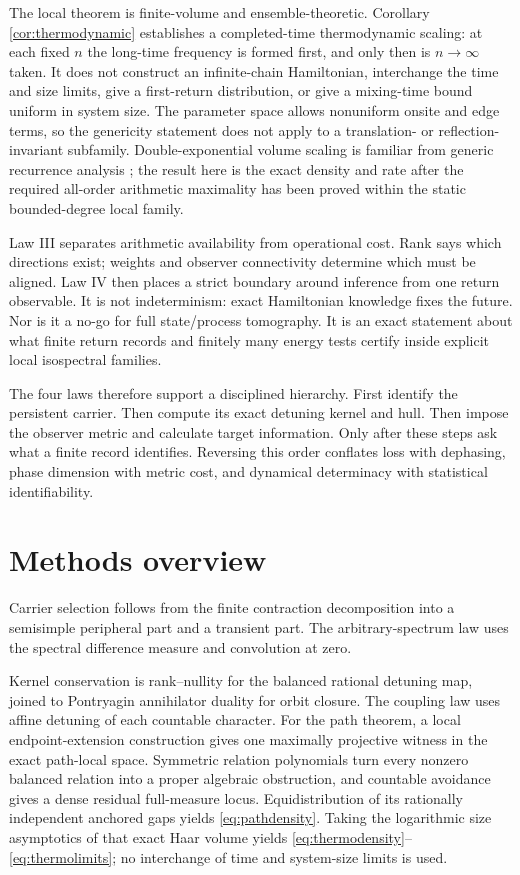 \documentclass[10pt]{article}
\theoremstyle{definition}
\begin{document}
The local theorem is finite-volume and ensemble-theoretic.  Corollary
\ref{cor:thermodynamic} establishes a completed-time thermodynamic scaling:
at each fixed $n$ the long-time frequency is formed first, and only then is
$n\to\infty$ taken.  It does not construct an infinite-chain Hamiltonian,
interchange the time and size limits, give a first-return distribution, or
give a mixing-time bound uniform in system size.  The parameter space allows
nonuniform onsite and edge terms, so the genericity statement does not apply
to a translation- or reflection-invariant subfamily.  Double-exponential
volume scaling is familiar from generic recurrence analysis
\cite{CamposVenuti2015}; the result here is the exact density and rate after
the required all-order arithmetic maximality has been proved within the
static bounded-degree local family.

Law III separates arithmetic availability from operational cost.  Rank says
which directions exist; weights and observer connectivity determine which
must be aligned.  Law IV then places a strict boundary around inference from
one return observable.  It is not indeterminism: exact Hamiltonian knowledge
fixes the future.  Nor is it a no-go for full state/process tomography.  It
is an exact statement about what finite return records and finitely many
energy tests certify inside explicit local isospectral families.

The four laws therefore support a disciplined hierarchy.  First identify
the persistent carrier.  Then compute its exact detuning kernel and hull.
Then impose the observer metric and calculate target information.  Only
after these steps ask what a finite record identifies.  Reversing this order
conflates loss with dephasing, phase dimension with metric cost, and dynamical
determinacy with statistical identifiability.

\section{Methods overview}

Carrier selection follows from the finite contraction decomposition into a
semisimple peripheral part and a transient part.  The arbitrary-spectrum
law uses the spectral difference measure and convolution at zero.

Kernel conservation is rank--nullity for the balanced rational detuning map,
joined to Pontryagin annihilator duality for orbit closure.  The coupling law
uses affine detuning of each countable character.  For the path theorem, a
local endpoint-extension construction gives one maximally projective witness
in the exact path-local space.  Symmetric relation polynomials turn every
nonzero balanced relation into a proper algebraic obstruction, and countable
avoidance gives a dense residual full-measure locus.  Equidistribution of its
rationally independent anchored gaps yields \eqref{eq:pathdensity}.
Taking the logarithmic size asymptotics of that exact Haar volume yields
\eqref{eq:thermodensity}--\eqref{eq:thermolimits}; no interchange of time and
system-size limits is used.
\end{document}
